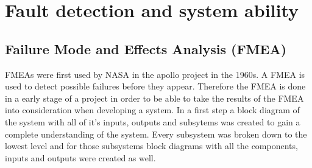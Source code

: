 \documentclass[ExampleMasters.tex]{subfiles}
\begin{document}
\clearpage


\chapter{Fault detection and system ability}
\label{chap:fault_detection}
\section{Failure Mode and Effects Analysis (FMEA)}
\label{sec:FMEA}
FMEAs were first used by NASA in the apollo project in the 1960s.
A FMEA is used to detect possible failures before they appear. Therefore the FMEA is done in a early stage of a project in order to be able to take the results of the FMEA into consideration when developing a system.
In a first step a block diagram of the system with all of it's inputs, outputs and subsytems was created to gain a complete understanding of the system. Every subsystem was broken down to the lowest level and for those subsystems block diagrams with all the components, inputs and outputs were created as well.
\end{document}

